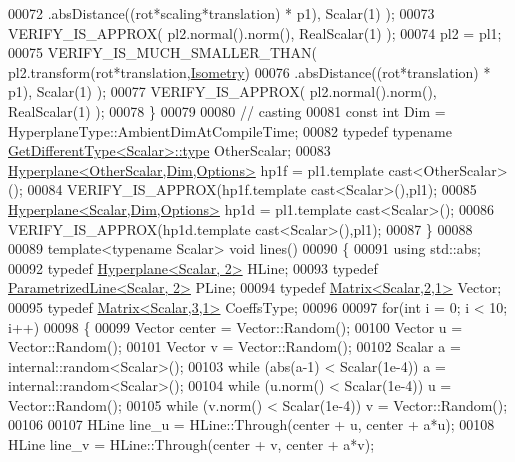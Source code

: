 \begin{DoxyCode}
00072                                   .absDistance((rot*scaling*translation) * p1), Scalar(1) );
00073     VERIFY\_IS\_APPROX( pl2.normal().norm(), RealScalar(1) );
00074     pl2 = pl1;
00075     VERIFY\_IS\_MUCH\_SMALLER\_THAN( pl2.transform(rot*translation,\hyperlink{group__enums_ggaee59a86102f150923b0cac6d4ff05107a080cd5366173608f701cd945c2335568}{Isometry})
00076                                  .absDistance((rot*translation) * p1), Scalar(1) );
00077     VERIFY\_IS\_APPROX( pl2.normal().norm(), RealScalar(1) );
00078   \}
00079 
00080   \textcolor{comment}{// casting}
00081   \textcolor{keyword}{const} \textcolor{keywordtype}{int} Dim = HyperplaneType::AmbientDimAtCompileTime;
00082   \textcolor{keyword}{typedef} \textcolor{keyword}{typename} \hyperlink{struct_get_different_type}{GetDifferentType<Scalar>::type} OtherScalar;
00083   \hyperlink{group___geometry___module_class_eigen_1_1_hyperplane}{Hyperplane<OtherScalar,Dim,Options>} hp1f = pl1.template 
      cast<OtherScalar>();
00084   VERIFY\_IS\_APPROX(hp1f.template cast<Scalar>(),pl1);
00085   \hyperlink{group___geometry___module_class_eigen_1_1_hyperplane}{Hyperplane<Scalar,Dim,Options>} hp1d = pl1.template cast<Scalar>();
00086   VERIFY\_IS\_APPROX(hp1d.template cast<Scalar>(),pl1);
00087 \}
00088 
00089 \textcolor{keyword}{template}<\textcolor{keyword}{typename} Scalar> \textcolor{keywordtype}{void} lines()
00090 \{
00091   \textcolor{keyword}{using} std::abs;
00092   \textcolor{keyword}{typedef} \hyperlink{group___geometry___module_class_eigen_1_1_hyperplane}{Hyperplane<Scalar, 2>} HLine;
00093   \textcolor{keyword}{typedef} \hyperlink{group___geometry___module_class_eigen_1_1_parametrized_line}{ParametrizedLine<Scalar, 2>} PLine;
00094   \textcolor{keyword}{typedef} \hyperlink{group___core___module_class_eigen_1_1_matrix}{Matrix<Scalar,2,1>} Vector;
00095   \textcolor{keyword}{typedef} \hyperlink{group___core___module}{Matrix<Scalar,3,1>} CoeffsType;
00096 
00097   \textcolor{keywordflow}{for}(\textcolor{keywordtype}{int} i = 0; i < 10; i++)
00098   \{
00099     Vector center = Vector::Random();
00100     Vector u = Vector::Random();
00101     Vector v = Vector::Random();
00102     Scalar a = internal::random<Scalar>();
00103     \textcolor{keywordflow}{while} (abs(a-1) < Scalar(1e-4)) a = internal::random<Scalar>();
00104     \textcolor{keywordflow}{while} (u.norm() < Scalar(1e-4)) u = Vector::Random();
00105     \textcolor{keywordflow}{while} (v.norm() < Scalar(1e-4)) v = Vector::Random();
00106 
00107     HLine line\_u = HLine::Through(center + u, center + a*u);
00108     HLine line\_v = HLine::Through(center + v, center + a*v);

\end{DoxyCode}
